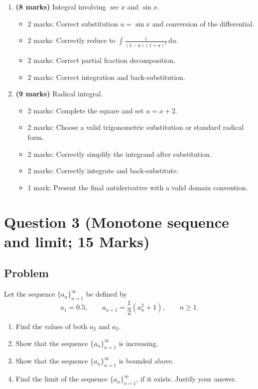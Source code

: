 \documentclass[12pt]{article}
\newcommand{\dd}{\,\mathrm{d}}
\begin{document}
\begin{enumerate}[label=(\alph*)]
\item \textbf{(8 marks)} Integral involving $\sec x$ and $\sin x$.
\begin{itemize}
\item 2 marks: Correct substitution $u=\sin x$ and conversion of the differential.
\item 2 marks: Correctly reduce to $\int \frac{1}{(1-u)(1+u)^2}\dd u$.
\item 2 marks: Correct partial fraction decomposition.
\item 2 marks: Correct integration and back-substitution.
\end{itemize}

\item \textbf{(9 marks)} Radical integral.
\begin{itemize}
\item 2 marks: Complete the square and set $u=x+2$.
\item 2 marks: Choose a valid trigonometric substitution or standard radical form.
\item 2 marks: Correctly simplify the integrand after substitution.
\item 2 marks: Correctly integrate and back-substitute.
\item 1 mark: Present the final antiderivative with a valid domain convention.
\end{itemize}
\end{enumerate}

\newpage
\section{Question 3 (Monotone sequence and limit; 15 Marks)}

\subsection{Problem}

Let the sequence $\{a_n\}_{n=1}^{\infty}$ be defined by
\[
a_1=0.5,
\qquad
 a_{n+1}=\frac12(a_n^2+1),
\qquad n\geq 1.
\]
\begin{enumerate}[label=(\roman*)]
\item Find the values of both $a_2$ and $a_3$.
\item Show that the sequence $\{a_n\}_{n=1}^{\infty}$ is increasing.
\item Show that the sequence $\{a_n\}_{n=1}^{\infty}$ is bounded above.
\item Find the limit of the sequence $\{a_n\}_{n=1}^{\infty}$, if it exists. Justify your answer.
\end{enumerate}
\end{document}
